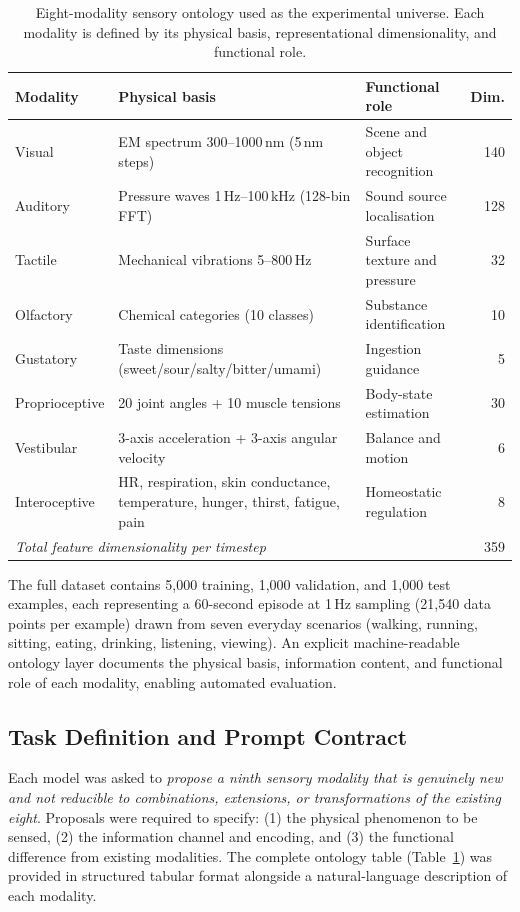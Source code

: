 \documentclass[pdflatex,sn-mathphys-num]{sn-jnl}
\begin{document}
\begin{table}[tp]
\caption{Eight-modality sensory ontology used as the experimental universe.
Each modality is defined by its physical basis, representational dimensionality, and
functional role.}
\label{tab:modalities}
\begin{tabularx}{\textwidth}{lXXr}
\toprule
\textbf{Modality} & \textbf{Physical basis} & \textbf{Functional role} & \textbf{Dim.} \\
\midrule
Visual       & EM spectrum 300--1000\,nm (5\,nm steps) & Scene and object recognition & 140 \\
Auditory     & Pressure waves 1\,Hz--100\,kHz (128-bin FFT) & Sound source localisation & 128 \\
Tactile      & Mechanical vibrations 5--800\,Hz & Surface texture and pressure & 32 \\
Olfactory    & Chemical categories (10 classes) & Substance identification & 10 \\
Gustatory    & Taste dimensions (sweet/sour/salty/bitter/umami) & Ingestion guidance & 5 \\
Proprioceptive & 20 joint angles + 10 muscle tensions & Body-state estimation & 30 \\
Vestibular   & 3-axis acceleration + 3-axis angular velocity & Balance and motion & 6 \\
Interoceptive & HR, respiration, skin conductance, temperature, hunger, thirst, fatigue, pain & Homeostatic regulation & 8 \\
\midrule
\multicolumn{3}{l}{\textit{Total feature dimensionality per timestep}} & 359 \\
\bottomrule
\end{tabularx}
\end{table}

The full dataset contains 5,000 training, 1,000 validation, and 1,000 test examples, each
representing a 60-second episode at 1\,Hz sampling (21,540 data points per example) drawn from
seven everyday scenarios (walking, running, sitting, eating, drinking, listening, viewing).  An
explicit machine-readable ontology layer documents the physical basis, information content, and
functional role of each modality, enabling automated evaluation.

\subsection{Task Definition and Prompt Contract}

Each model was asked to \emph{propose a ninth sensory modality that is genuinely new and not
reducible to combinations, extensions, or transformations of the existing eight}.  Proposals
were required to specify: (1) the physical phenomenon to be sensed, (2) the information channel
and encoding, and (3) the functional difference from existing modalities.  The complete ontology
table (Table~\ref{tab:modalities}) was provided in structured tabular format alongside a
natural-language description of each modality.
\end{document}
